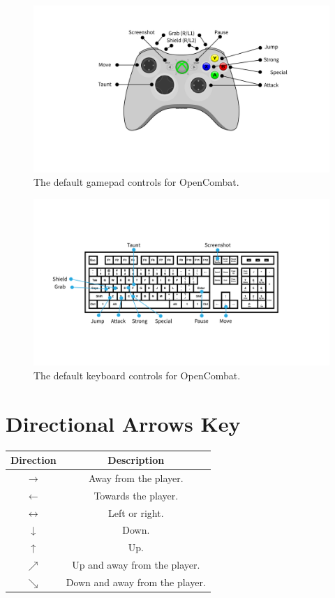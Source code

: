\begin{figure}[h!]
    \centering
    \includegraphics[width=.8\linewidth]{images/gamepad.png}
    \caption{The default gamepad controls for OpenCombat.}
\end{figure}

\begin{figure}[h!]
    \centering
    \includegraphics[width=1\linewidth]{images/keyboard.png}
    \caption{The default keyboard controls for OpenCombat.}
\end{figure}

\pagebreak

\section{Directional Arrows Key}

\begin{table}[h!]
    \centering
    \begin{tabular}{| c | c |}
        \hline
        \textbf{Direction} & \textbf{Description} \\
        \hline
        $\rightarrow$ & Away from the player.\\
        \hline
        $\leftarrow$ & Towards the player.\\
        \hline
        $\leftrightarrow$ & Left or right.\\
        \hline
        $\downarrow$ & Down.\\
        \hline
        $\uparrow$ & Up.\\
        \hline
        $\nearrow$ & Up and away from the player.\\
        \hline
        $\searrow$ & Down and away from the player.\\
        \hline
    \end{tabular}
\end{table}

